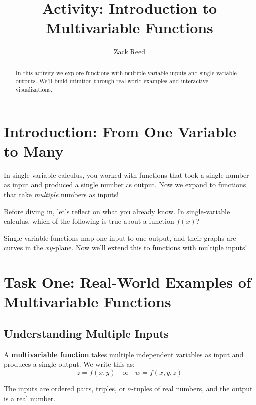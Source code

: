 \documentclass{ximera}
\title{Activity: Introduction to Multivariable Functions}
\author{Zack Reed}
\begin{document}
\begin{abstract}
In this activity we explore functions with multiple variable inputs and single-variable outputs. We'll build intuition through real-world examples and interactive visualizations.
\end{abstract}
\maketitle

\section*{Introduction: From One Variable to Many}

In single-variable calculus, you worked with functions that took a single number as input and produced a single number as output. Now we expand to functions that take \emph{multiple} numbers as inputs!

\begin{problem}
Before diving in, let's reflect on what you already know. In single-variable calculus, which of the following is true about a function $f(x)$?

\begin{selectAll}
\end{selectAll}

\begin{feedback}
Single-variable functions map one input to one output, and their graphs are curves in the $xy$-plane. Now we'll extend this to functions with multiple inputs!
\end{feedback}
\end{problem}

\section*{Task One: Real-World Examples of Multivariable Functions}

\subsection*{Understanding Multiple Inputs}

\begin{definition}
A \textbf{multivariable function} takes multiple independent variables as input and produces a single output. We write this as:
$$z = f(x, y) \quad \text{or} \quad w = f(x, y, z)$$

The inputs are ordered pairs, triples, or $n$-tuples of real numbers, and the output is a real number.
\end{definition}
\end{document}
